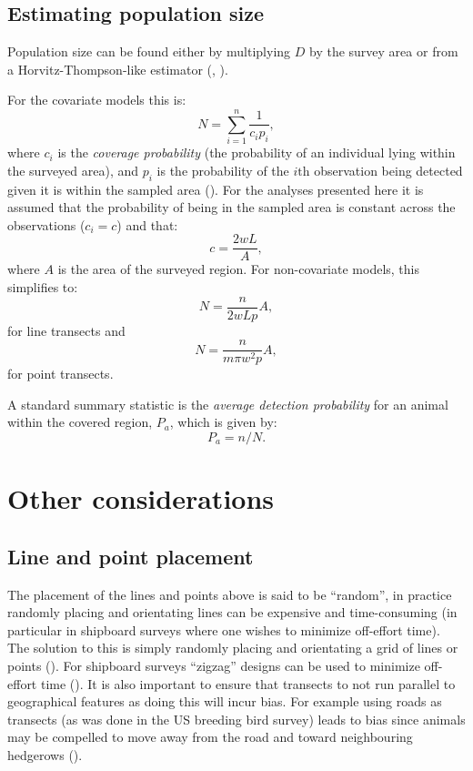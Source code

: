 \subsection{Estimating population size}
\label{intro-ds-pop-size}

Population size can be found either by multiplying $D$ by the survey area or from a Horvitz-Thompson-like estimator (\cite[pp. 53-56]{thompson}, \cite[p. 23]{ADS}).

For the covariate models this is:
\begin{equation}
N = \sum_{i=1}^n \frac{1}{c_i p_i},
\label{HT-ds-est}
\end{equation}
where $c_i$ is the \textit{coverage probability} (the probability of an individual lying within the surveyed area), and $p_i$ is the probability of the $i\text{th}$ observation being detected given it is within the sampled area (\cite[p. 7 and 38]{ADS}). For the analyses presented here it is assumed that the probability of being in the sampled area is constant across the observations ($c_i=c$) and that:
\begin{equation*}
c=\frac{2wL}{A},
\end{equation*}
where $A$ is the area of the surveyed region. For non-covariate models, this simplifies to:
\begin{equation*}
N =  \frac{n}{2 w L p}A,
\end{equation*}
for line transects and
\begin{equation*}
N =  \frac{n}{m \pi w^2 p}A,
\end{equation*}
for point transects.

A standard summary statistic is the \textit{average detection probability} for an animal within the covered region, $P_a$, which is given by:
\begin{equation*}
P_a = n/N.
\end{equation*}

\section{Other considerations}

\subsection{Line and point placement}
The placement of the lines and points above is said to be ``random'', in practice randomly placing and orientating lines can be expensive and time-consuming (in particular in shipboard surveys where one wishes to minimize off-effort time). The solution to this is simply randomly placing and orientating a grid of lines or points (\cite[p. 2]{IDS}). For shipboard surveys ``zigzag'' designs can be used to minimize off-effort time (\cite{strindberg04}). It is also important to ensure that transects to not run parallel to geographical features as doing this will incur bias. For example using roads as transects (as was done in the US breeding bird survey) leads to bias since animals may be compelled to move away from the road and toward neighbouring hedgerows (\cite[p. 18]{IDS}).

